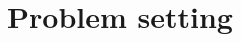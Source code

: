 \documentclass[thesis.tex]{subfiles}
\newcommand{\Zowa}{Z^{\textit{owa}}}
\begin{document}


\vspace{-0.1in}
\section{Problem setting}
\label{sec:owa:problem}
\end{document}
